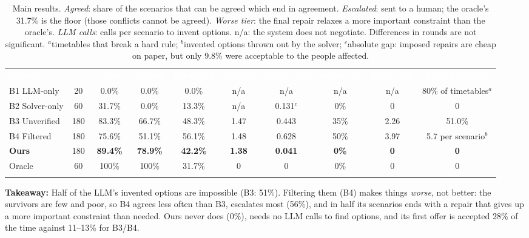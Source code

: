\documentclass[10pt,a4paper]{article}
\newcommand{\hdr}{\rowcolor{secblue}}
\newcommand{\hd}[1]{\textcolor{white}{\textbf{#1}}}
\newcommand{\oursrow}{\rowcolor{gapfill}}
\newcommand{\tk}[1]{\textbf{Takeaway:} #1}
\begin{document}
\begin{table}[H]
\centering\footnotesize
\setlength{\tabcolsep}{4pt}
\begin{tabularx}{\textwidth}{l c C C C C C C C c}
\toprule{}
\hdr \hd{System} & \hd{$n$} & \hd{Correct} & \hd{Agreed} & \hd{Escalated} & \hd{Rounds} & \hd{Oracle gap} & \hd{Worse tier} & \hd{LLM calls} & \hd{Invalid options}\\
\midrule{}
B1 LLM-only & 20 & 0.0\% & 0.0\% & 0.0\% & n/a & n/a & n/a & n/a & 80\% of timetables$^{a}$\\
B2 Solver-only & 60 & 31.7\% & 0.0\% & 13.3\% & n/a & 0.131$^{c}$ & 0\% & 0 & 0\\
B3 Unverified & 180 & 83.3\% & 66.7\% & 48.3\% & 1.47 & 0.443 & 35\% & 2.26 & 51.0\%\\
B4 Filtered & 180 & 75.6\% & 51.1\% & 56.1\% & 1.48 & 0.628 & 50\% & 3.97 & 5.7 per scenario$^{b}$\\
\oursrow\textbf{Ours} & 180 & \textbf{89.4\%} & \textbf{78.9\%} & \textbf{42.2\%} & \textbf{1.38} & \textbf{0.041} & \textbf{0\%} & \textbf{0} & \textbf{0}\\
Oracle & 60 & 100\% & 100\% & 31.7\% & 0 & 0 & 0\% & 0 & 0\\
\bottomrule{}
\end{tabularx}
\caption{Main results. \emph{Agreed}: share of the scenarios that can be agreed which end in agreement.
\emph{Escalated}: sent to a human; the oracle's 31.7\% is the floor (those conflicts cannot be agreed).
\emph{Worse tier}: the final repair relaxes a more important constraint than the oracle's.
\emph{LLM calls}: calls per scenario to invent options. n/a: the system does not negotiate.
Differences in rounds are not significant.
$^{a}$timetables that break a hard rule; $^{b}$invented options thrown out by the solver;
$^{c}$absolute gap: imposed repairs are cheap on paper, but only 9.8\% were acceptable to the people affected.}
\end{table}

\begin{takeaway}
\tk{Half of the LLM's invented options are impossible (B3: 51\%). Filtering them (B4)
makes things \emph{worse}, not better: the survivors are few and poor, so B4 agrees less
often than B3, escalates most (56\%), and in half its scenarios ends with a repair that gives up a
more important constraint than needed. Ours never does (0\%), needs no LLM calls to find options,
and its first offer is accepted 28\% of the time against 11--13\% for B3/B4.}
\end{takeaway}
\end{document}
